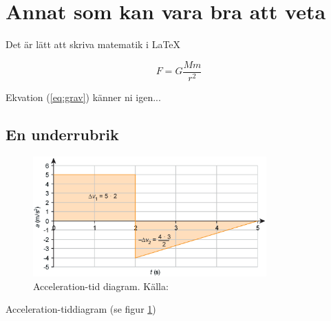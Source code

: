 \documentclass[11p]{article}
\begin{document}
\section{Annat som kan vara bra att veta}
Det är lätt att skriva matematik i \LaTeX

\begin{equation}
    F = G \frac{M m}{r^2}
    \label{eq:grav}
\end{equation}

Ekvation (\ref{eq:grav}) känner ni igen...
\clearpage
\subsection{En underrubrik}
    \begin{figure}[!h]
        \includegraphics[width=0.8\textwidth]{accelerationTime.png}
        \caption{Acceleration-tid diagram. Källa: \textcite{Fraenkel}}
        \label{fig:acc}
    \end{figure}

Acceleration-tiddiagram (se figur \ref{fig:acc})

\printbibliography
\end{document}
